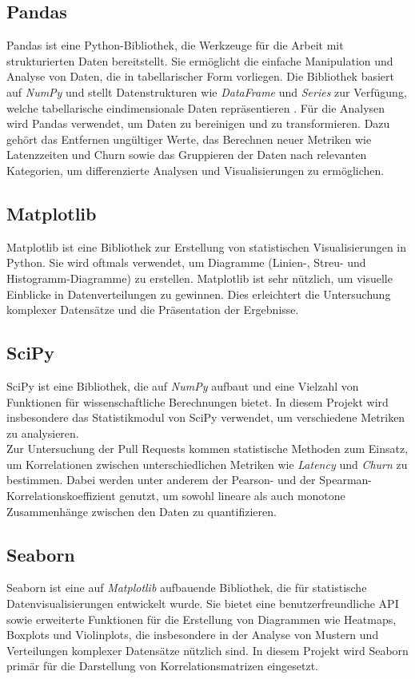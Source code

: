 \subsection{Pandas}
Pandas ist eine Python-Bibliothek, die Werkzeuge für die Arbeit mit strukturierten Daten bereitstellt. Sie ermöglicht die einfache Manipulation und Analyse von Daten, die in tabellarischer Form vorliegen. Die Bibliothek basiert auf \textit{NumPy} und stellt Datenstrukturen wie \textit{DataFrame} und \textit{Series} zur Verfügung, welche tabellarische eindimensionale Daten repräsentieren  \parencite{noauthor_pandas_nodate}. Für die Analysen wird Pandas verwendet, um Daten zu bereinigen und zu transformieren. Dazu gehört das Entfernen ungültiger Werte, das Berechnen neuer Metriken wie Latenzzeiten und Churn sowie das Gruppieren der Daten nach relevanten Kategorien, um differenzierte Analysen und Visualisierungen zu ermöglichen.

\subsection{Matplotlib}
Matplotlib ist eine Bibliothek zur Erstellung von statistischen Visualisierungen in Python. Sie wird oftmals verwendet, um Diagramme (Linien-, Streu- und Histogramm-Diagramme) zu erstellen. Matplotlib ist sehr nützlich, um visuelle Einblicke in Datenverteilungen zu gewinnen. Dies erleichtert die Untersuchung komplexer Datensätze und die Präsentation der Ergebnisse. \parencite{noauthor_matplotlib_nodate}

\subsection{SciPy}
SciPy ist eine Bibliothek, die auf \textit{NumPy} aufbaut und eine Vielzahl von Funktionen für wissenschaftliche Berechnungen bietet. In diesem Projekt wird insbesondere das Statistikmodul von SciPy verwendet, um verschiedene Metriken zu analysieren. \\
Zur Untersuchung der Pull Requests kommen statistische Methoden zum Einsatz, um Korrelationen zwischen unterschiedlichen Metriken wie \textit{Latency} und \textit{Churn} zu bestimmen. Dabei werden unter anderem der Pearson- und der Spearman-Korre\-lations\-koeffizient genutzt, um sowohl lineare als auch monotone Zusammenhänge zwischen den Daten zu quantifizieren. \parencite{noauthor_scipy_nodate}

\subsection{Seaborn}
Seaborn ist eine auf \textit{Matplotlib} aufbauende Bibliothek, die für statistische Datenvisualisierungen entwickelt wurde. Sie bietet eine benutzerfreundliche API sowie erweiterte Funktionen für die Erstellung von Diagrammen wie Heatmaps, Boxplots und Violinplots, die insbesondere in der Analyse von Mustern und Verteilungen komplexer Datensätze nützlich sind.
In diesem Projekt wird Seaborn primär für die Darstellung von Korrelationsmatrizen eingesetzt. \parencite{waskom_seaborn_2021}

